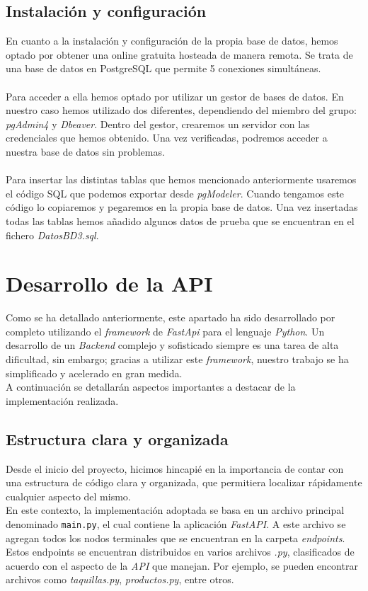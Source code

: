 \documentclass[12pt]{report}
\begin{document}
\section{Instalación y configuración}
En cuanto a la instalación y configuración de la propia base de datos, hemos optado por obtener una online gratuita hosteada de manera remota. Se trata de una base de datos en PostgreSQL que permite 5 conexiones simultáneas.
\\\\
Para acceder a ella hemos optado por utilizar un gestor de bases de datos. En nuestro caso hemos utilizado dos diferentes, dependiendo del miembro del grupo: \textit{pgAdmin4} y \textit{Dbeaver}. Dentro del gestor, crearemos un servidor con las credenciales que hemos obtenido. Una vez verificadas, podremos acceder a nuestra base de datos sin problemas.
\\\\
Para insertar las distintas tablas que hemos mencionado anteriormente usaremos el código SQL que podemos exportar desde \textit{pgModeler}. Cuando tengamos este código lo copiaremos y pegaremos en la propia base de datos. Una vez insertadas todas las tablas hemos añadido algunos datos de prueba que se encuentran en el fichero \textit{DatosBD3.sql}.


\chapter{Desarrollo de la API}
Como se ha detallado anteriormente, este apartado ha sido desarrollado por completo utilizando el \textit{framework} de \textit{FastApi} para el lenguaje \textit{Python}. Un desarrollo de un \textit{Backend} complejo y sofisticado siempre es una tarea de alta dificultad, sin embargo; gracias a utilizar este \textit{framework}, nuestro trabajo se ha simplificado y acelerado en gran medida.
\\
A continuación se detallarán aspectos importantes a destacar de la implementación realizada.
\section{Estructura clara y organizada}
Desde el inicio del proyecto, hicimos hincapié en la importancia de contar con una estructura de código clara y organizada, que permitiera localizar rápidamente cualquier aspecto del mismo.
\\

En este contexto, la implementación adoptada se basa en un archivo principal denominado \texttt{main.py}, el cual contiene la aplicación \textit{FastAPI}. A este archivo se agregan todos los nodos terminales que se encuentran en la carpeta \textit{endpoints}. Estos endpoints se encuentran distribuidos en varios archivos \textit{.py}, clasificados de acuerdo con el aspecto de la \textit{API} que manejan. Por ejemplo, se pueden encontrar archivos como \textit{taquillas.py}, \textit{productos.py}, entre otros.
\\
\end{document}
